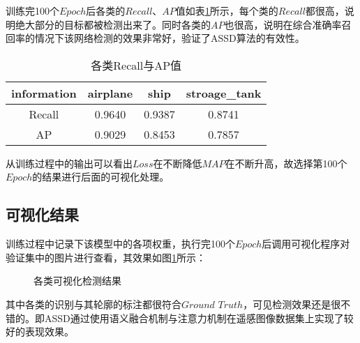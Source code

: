 训练完100个$Epoch$后各类的$Recall$、$AP$值如表\ref{RecAP}所示，每个类的$Recall$都很高，说明绝大部分的目标都被检测出来了。同时各类的$AP$也很高，说明在综合准确率召回率的情况下该网络检测的效果非常好，验证了ASSD算法的有效性。

\begin{table}
	\caption{各类Recall与AP值}
	\centering
	\begin{tabular}{cccc}
		\hline
		information & airplane & ship & stroage\_tank\\
		\hline
		Recall & 0.9640 & 0.9387 & 0.8741\\
		AP & 0.9029 & 0.8453 & 0.7857\\
		\hline
	\end{tabular}
	\label{RecAP}
\end{table}

从训练过程中的输出可以看出$Loss$在不断降低$MAP$在不断升高，故选择第100个$Epoch$的结果进行后面的可视化处理。

\subsection{可视化结果}

训练过程中记录下该模型中的各项权重，执行完100个$Epoch$后调用可视化程序对验证集中的图片进行查看，其效果如图\ref{DisPic}所示：
\begin{figure}[htbp]
	\centering
	\caption{各类可视化检测结果}
	\label{DisPic}
\end{figure}

其中各类的识别与其轮廓的标注都很符合$Ground$ $Truth$，可见检测效果还是很不错的。即ASSD通过使用语义融合机制与注意力机制在遥感图像数据集上实现了较好的表现效果。


